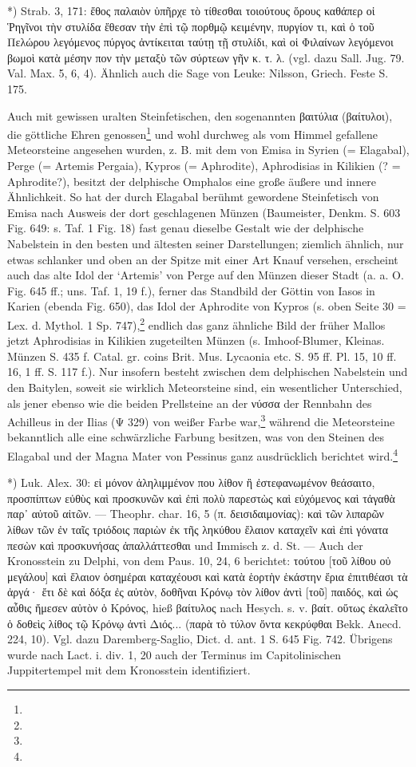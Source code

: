 \documentclass[a4paper, 11pt, oneside]{article}
\begin{document}
*) Strab. 3, 171:  ἔθος παλαιὸν ὑπῆρχε τὸ τίθεσθαι τοιούτους ὅρους καθάπερ οἱ Ῥηγῖνοι τὴν στυλίδα ἔθεσαν τὴν ἐπὶ τῷ πορθμῷ κειμένην, πυργίον τι, καὶ ὁ τοῦ Πελώρου λεγόμενος πύργος ἀντίκειται ταύτῃ τῇ στυλίδι, καὶ οἱ Φιλαίνων λεγόμενοι βωμοὶ κατὰ μέσην πον τὴν μεταξὺ τῶν σύρτεων γῆν κ. τ. λ. (vgl. dazu Sall. Jug. 79. Val. Max. 5, 6, 4). Ähnlich auch die Sage von Leuke: Nilsson, Griech. Feste S. 175.

Auch mit gewissen uralten Steinfetischen, den sogenannten βαιτύλια (βαίτυλοι), die göttliche Ehren genossen\footnote{} und wohl durchweg als vom Himmel gefallene Meteorsteine angesehen wurden, z. B. mit dem von Emisa in Syrien (= Elagabal), Perge (= Artemis Pergaia), Kypros (= Aphrodite), Aphrodisias in Kilikien (? = Aphrodite?), besitzt der delphische Omphalos eine große äußere und innere Ähnlichkeit. So hat der durch Elagabal berühmt gewordene Steinfetisch von Emisa nach Ausweis der dort geschlagenen Münzen (Baumeister, Denkm. S. 603 Fig. 649: s. Taf. 1 Fig. 18) fast genau dieselbe Gestalt wie der delphische Nabelstein in den besten und ältesten seiner Darstellungen; ziemlich ähnlich, nur etwas schlanker und oben an der Spitze mit einer Art Knauf versehen, erscheint auch das alte Idol der `Artemis' von Perge auf den Münzen dieser Stadt (a. a. O. Fig. 645 ff.; uns. Taf. 1, 19 f.), ferner das Standbild der Göttin von Iasos in Karien (ebenda Fig. 650), das Idol der Aphrodite von Kypros (s. oben Seite 30 = Lex. d. Mythol. 1 Sp. 747),\footnote{} endlich das ganz ähnliche Bild der früher Mallos jetzt Aphrodisias in Kilikien zugeteilten Münzen (s. Imhoof-Blumer, Kleinas. Münzen S. 435 f. Catal. gr. coins Brit. Mus. Lycaonia etc. S. 95 ff. Pl. 15, 10 ff. 16, 1 ff. S. 117 f.). Nur insofern besteht zwischen dem delphischen Nabelstein und den Baitylen, soweit sie wirklich Meteorsteine sind, ein wesentlicher Unterschied, als jener ebenso wie die beiden Prellsteine an der νύσσα der Rennbahn des Achilleus in der Ilias (Ψ 329) von weißer Farbe war,\footnote{} während die Meteorsteine bekanntlich alle eine schwärzliche Farbung besitzen, was von den Steinen des Elagabal und der Magna Mater von Pessinus ganz ausdrücklich berichtet wird.\footnote{}

*) Luk. Alex. 30: εἰ μόνον ἀληλιμμένον που λίθον ἢ ἐστεφανωμένον θεάσαιτο, προσπίπτων εὐθὺς καὶ προσκυνῶν καὶ ἐπὶ πολὺ παρεστὼς καὶ εὐχόμενος καὶ τἀγαθὰ παρ᾽ αὐτοῦ αἰτῶν. --- Theophr. char. 16, 5 (π. δεισιδαιμονίας): καὶ τῶν λιπαρῶν λίθων τῶν ἐν ταῖς τριόδοις παριὼν ἐκ τῆς ληκύθου ἔλαιον καταχεῖν καὶ ἐπὶ γόνατα πεσὼν καὶ προσκυνήσας ἀπαλλάττεσθαι und Immisch z. d. St. --- Auch der Kronosstein zu Delphi, von dem Paus. 10, 24, 6 berichtet: τούτου [τοῦ λίθου οὐ μεγάλου] καὶ ἔλαιον ὁσημέραι καταχέουσι καὶ κατὰ ἑορτὴν ἑκάστην ἔρια ἐπιτιθέασι τὰ ἀργά· ἔτι δὲ καὶ δόξα ἐς αὐτὸν, δοθῆναι Κρόνῳ τὸν λίθον ἀντὶ [τοῦ] παιδός, καὶ ὡς αὖθις ἤμεσεν αὐτὸν ὁ Κρόνος, hieß βαίτυλος nach Hesych. s. v. βαίτ. οὕτως ἐκαλεῖτο ὁ δοθεὶς λίθος τῷ Κρόνῳ ἀντὶ Διός... (παρὰ τὸ τύλον ὄντα κεκρύφθαι Bekk. Anecd. 224, 10). Vgl. dazu Daremberg-Saglio, Dict. d. ant. 1 S. 645 Fig. 742. Übrigens wurde nach Lact. i. div. 1, 20 auch der Terminus im Capitolinischen Juppitertempel mit dem Kronosstein identifiziert.
\end{document}
